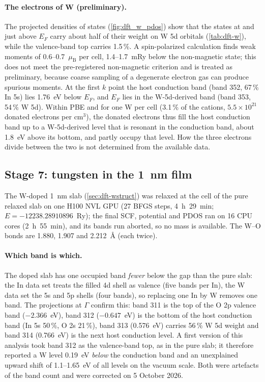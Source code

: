\paragraph{The electrons of W (preliminary).} The projected densities of states (\cref{fig:dft_w_pdos}) show that the
states at and just above $E_F$ carry about half of their weight on W 5d orbitals (\cref{tab:dft-w}), while the
valence-band top carries 1.5\,\%. A spin-polarized calculation finds weak moments of 0.6--0.7~$\mu_{\mathrm{B}}$ per cell,
1.4--1.7~mRy below the non-magnetic state; this does not meet the pre-registered non-magnetic criterion and is treated
as preliminary, because coarse sampling of a degenerate electron gas can produce spurious moments. At the first $k$
point the host conduction band (band 352, 67\,\% In 5s) lies 1.76~eV below $E_F$, and $E_F$ lies in the
W-5d-derived band (band 353, 54\,\% W 5d). Within PBE and for one W per cell (3.1\,\% of the cations,
$5.5\times10^{21}$ donated electrons per cm$^3$), the donated electrons thus fill the host conduction band up to a
W-5d-derived level that is resonant in the conduction band, about 1.8~eV above its bottom, and partly occupy that level.
How the three electrons divide between the two is not determined from the available data.

\subsection{Stage 7: tungsten in the 1~nm film}
\label{sec:dft-calc-iwoslab}

The W-doped 1~nm slab (\cref{sec:dft-wstruct}) was relaxed at the cell of the pure relaxed slab on one H100 NVL GPU
(27 BFGS steps, 4~h~29~min; $E = -12238.28910896$~Ry); the final SCF, potential and PDOS ran on 16 CPU cores
(2~h~55~min), and its bands run aborted, so no mass is available. The W--O bonds are 1.880, 1.907 and 2.212~\AA{}
(each twice).

\paragraph{Which band is which.} The doped slab has one occupied band \emph{fewer} below the gap than the pure slab:
the In data set treats the filled 4d shell as valence (five bands per In), the W data set the 5s and 5p shells (four
bands), so replacing one In by W removes one band. The projections at $\Gamma$ confirm this: band 311 is the top of
the O 2p valence band ($-2.366$~eV), band 312 ($-0.647$~eV) is the bottom of the host conduction band (In 5s 50\,\%,
O 2s 21\,\%), band 313 (0.576~eV) carries 56\,\% W 5d weight and band 314 (0.766~eV) is the next host conduction
level. A first version of this analysis took band 312 as the valence-band top, as in the pure slab; it therefore
reported a W level 0.19~eV \emph{below} the conduction band and an unexplained upward shift of 1.1--1.65~eV of all
levels on the vacuum scale. Both were artefacts of the band count and were corrected on 5 October 2026.

